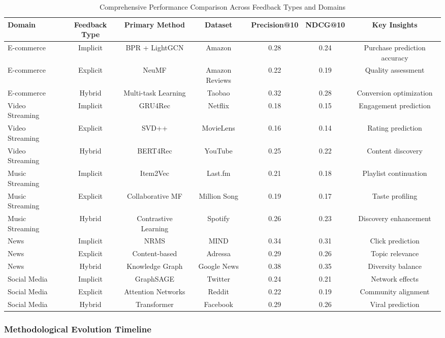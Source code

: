 \documentclass[acmsmall,review,anonymous]{acmart}
\begin{document}
\begin{table}[h]
\centering
\caption{Comprehensive Performance Comparison Across Feedback Types and Domains}
\label{tab:comprehensive_performance}
\begin{tabular}{@{}lcccccc@{}}
\toprule
Domain & Feedback Type & Primary Method & Dataset & Precision@10 & NDCG@10 & Key Insights \\
\midrule
E-commerce & Implicit & BPR + LightGCN & Amazon & 0.28 & 0.24 & Purchase prediction accuracy \\
E-commerce & Explicit & NeuMF & Amazon Reviews & 0.22 & 0.19 & Quality assessment \\
E-commerce & Hybrid & Multi-task Learning & Taobao & 0.32 & 0.28 & Conversion optimization \\
\midrule
Video Streaming & Implicit & GRU4Rec & Netflix & 0.18 & 0.15 & Engagement prediction \\
Video Streaming & Explicit & SVD++ & MovieLens & 0.16 & 0.14 & Rating prediction \\
Video Streaming & Hybrid & BERT4Rec & YouTube & 0.25 & 0.22 & Content discovery \\
\midrule
Music Streaming & Implicit & Item2Vec & Last.fm & 0.21 & 0.18 & Playlist continuation \\
Music Streaming & Explicit & Collaborative MF & Million Song & 0.19 & 0.17 & Taste profiling \\
Music Streaming & Hybrid & Contrastive Learning & Spotify & 0.26 & 0.23 & Discovery enhancement \\
\midrule
News & Implicit & NRMS & MIND & 0.34 & 0.31 & Click prediction \\
News & Explicit & Content-based & Adressa & 0.29 & 0.26 & Topic relevance \\
News & Hybrid & Knowledge Graph & Google News & 0.38 & 0.35 & Diversity balance \\
\midrule
Social Media & Implicit & GraphSAGE & Twitter & 0.24 & 0.21 & Network effects \\
Social Media & Explicit & Attention Networks & Reddit & 0.22 & 0.19 & Community alignment \\
Social Media & Hybrid & Transformer & Facebook & 0.29 & 0.26 & Viral prediction \\
\bottomrule
\end{tabular}
\end{table}

\subsubsection{Methodological Evolution Timeline}
\end{document}
